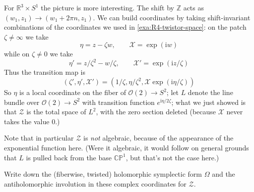 \documentclass[12pt,letterpaper,reqno]{article}
\numberwithin{equation}{section}
\newcommand{\cZ}{\ensuremath{\mathcal Z}}
\newcommand{\cO}{\ensuremath{\mathcal O}}
\newcommand{\cX}{\ensuremath{\mathcal X}}
\newcommand{\R}{\ensuremath{\mathbb R}}
\newcommand{\C}{\ensuremath{\mathbb C}}
\newcommand{\PP}{\ensuremath{\mathbb P}}
\newcommand{\Z}{\ensuremath{\mathbb Z}}
\newcommand{\I}{{\mathrm i}}
\newcommand{\ti}[1]{\textit{#1}}
\newcommand{\fixme}[1]{{\color{orange}{[#1]}}}
\begin{document}
\begin{example}[Twistor space of $\R^3 \times S^1$]  \label{exa:R3S1-twistor-space}
For $\R^3 \times S^1$ the picture is more interesting.
The shift by $\Z$ acts as $(w_1,z_1) \to (w_1 + 2 \pi n, z_1)$.
We can build coordinates by taking shift-invariant
combinations of the coordinates we used in
\autoref{exa:R4-twistor-space}:
on the patch $\zeta \neq \infty$ we take
\begin{equation}
 \eta = z - \zeta w, \qquad \cX = \exp(\I w)
\end{equation}
while on $\zeta \neq 0$ we take
\begin{equation}
 \eta' = z / \zeta^2 - w / \zeta, \qquad \cX' = \exp(\I z / \zeta)
\end{equation}
Thus the transition map is
\begin{equation}
  (\zeta', \eta', \cX') = (1 / \zeta, \eta / \zeta^2, \cX \exp(\I \eta / \zeta) )
\end{equation}
So $\eta$ is a local coordinate on the fiber of $\cO(2) \to S^2$;
let $L$ denote the line bundle over $\cO(2) \to S^2$ with
transition function $e^{\I \eta / 2 \zeta}$; what we just showed
is that $\cZ$ is the total space of $L^2$, with the
zero section deleted (because $\cX$ never takes the value $0$.)

Note that in particular $\cZ$ is \ti{not} algebraic, because of the
appearance of the exponential function here. (Were it algebraic,
it would follow on general grounds that $L$ is pulled back from
the base $\C\PP^1$, but that's not the case here.)
\end{example}

\begin{exercise} Write down the (fiberwise, twisted) holomorphic symplectic form
$\Omega$ and the antiholomorphic involution in these complex
coordinates for $\cZ$.
\end{exercise}


\end{document}
